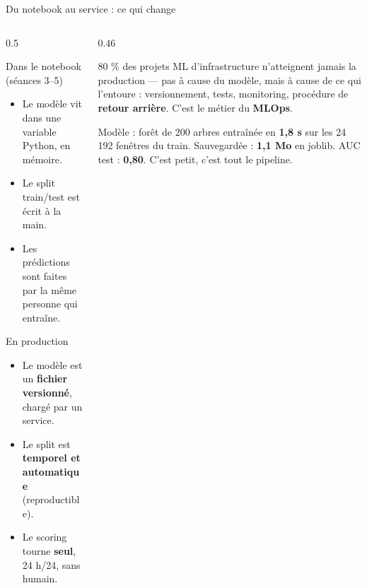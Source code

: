 \begin{frame}{Du notebook au service : ce qui change}
\small
\begin{columns}[t]
\begin{column}{0.5\textwidth}
\begin{block}{Dans le notebook (séances 3--5)}
\begin{itemize}
\item Le modèle vit dans une variable Python, en mémoire.
\item Le split train/test est écrit à la main.
\item Les prédictions sont faites par la même personne qui entraîne.
\end{itemize}
\end{block}
\begin{block}{En production}
\begin{itemize}
\item Le modèle est un \textbf{fichier versionné}, chargé par un service.
\item Le split est \textbf{temporel et automatique} (reproductible).
\item Le scoring tourne \textbf{seul}, 24 h/24, sans humain.
\end{itemize}
\end{block}
\end{column}
\begin{column}{0.46\textwidth}
\begin{wbox}
80 \% des projets ML d'infrastructure n'atteignent jamais la production ---
pas à cause du modèle, mais à cause de ce qui l'entoure : versionnement,
tests, monitoring, procédure de \textbf{retour arrière}. C'est le métier du
\textbf{MLOps}.
\end{wbox}
\begin{ebox}
Modèle : forêt de 200 arbres entraînée en \textbf{1,8 s} sur les 24 192
fenêtres du train. Sauvegardée : \textbf{1,1 Mo} en joblib. AUC test :
\textbf{0,80}. C'est petit, c'est tout le pipeline.
\end{ebox}
\end{column}
\end{columns}
\end{frame}

